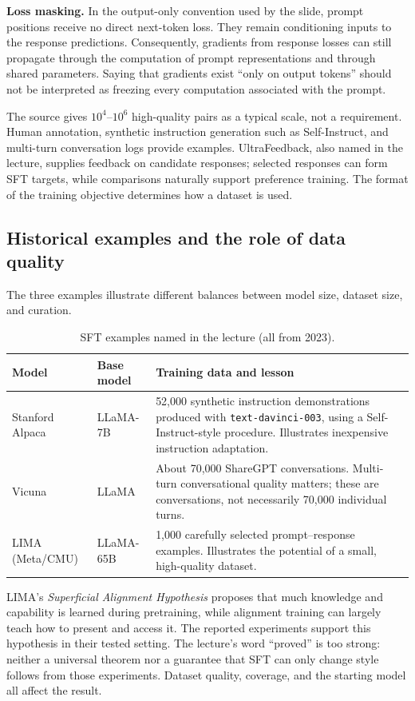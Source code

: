 \documentclass[11pt,a4paper]{article}
\numberwithin{equation}{section}
\numberwithin{figure}{section}
\numberwithin{table}{section}
\begin{document}
\textbf{Loss masking.} In the output-only convention used by the slide, prompt positions receive no direct next-token loss. They remain conditioning inputs to the response predictions. Consequently, gradients from response losses can still propagate through the computation of prompt representations and through shared parameters. Saying that gradients exist ``only on output tokens'' should not be interpreted as freezing every computation associated with the prompt.

The source gives $10^4$--$10^6$ high-quality pairs as a typical scale, not a requirement. Human annotation, synthetic instruction generation such as Self-Instruct, and multi-turn conversation logs provide examples. UltraFeedback, also named in the lecture, supplies feedback on candidate responses; selected responses can form SFT targets, while comparisons naturally support preference training. The format of the training objective determines how a dataset is used.

\subsection{Historical examples and the role of data quality}\label{sec:sftexamples}
The three examples illustrate different balances between model size, dataset size, and curation.
\begin{table}[htbp]\centering\small
\caption{SFT examples named in the lecture (all from 2023).}
\begin{tabularx}{\textwidth}{@{}P{22mm}P{24mm}Y@{}}\toprule
Model & Base model & Training data and lesson\\\midrule
Stanford Alpaca & LLaMA-7B & 52,000 synthetic instruction demonstrations produced with \texttt{text-davinci-003}, using a Self-Instruct-style procedure. Illustrates inexpensive instruction adaptation.\\\addlinespace
Vicuna & LLaMA & About 70,000 ShareGPT conversations. Multi-turn conversational quality matters; these are conversations, not necessarily 70,000 individual turns.\\\addlinespace
LIMA (Meta/CMU) & LLaMA-65B & 1,000 carefully selected prompt--response examples. Illustrates the potential of a small, high-quality dataset.\\\bottomrule
\end{tabularx}\end{table}\FloatBarrier
LIMA's \emph{Superficial Alignment Hypothesis} proposes that much knowledge and capability is learned during pretraining, while alignment training can largely teach how to present and access it. The reported experiments support this hypothesis in their tested setting. The lecture's word ``proved'' is too strong: neither a universal theorem nor a guarantee that SFT can only change style follows from those experiments. Dataset quality, coverage, and the starting model all affect the result.
\end{document}

